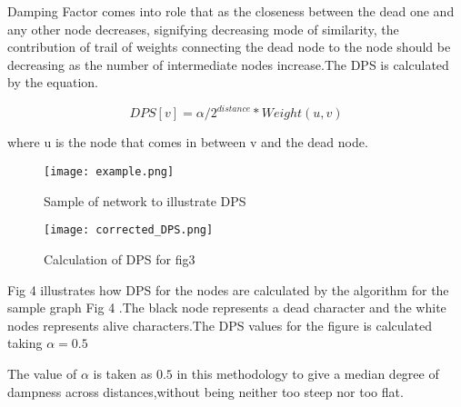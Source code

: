 \documentclass[conference]{IEEEtran}
\begin{document}
Damping Factor comes into role that as the closeness between the dead one and any other node decreases, signifying decreasing mode of similarity, the contribution of trail of weights connecting the dead node to the node should be decreasing as the number of intermediate nodes increase.The DPS is calculated by the equation.


$$DPS[v]= \alpha/2^{distance}*Weight(u,v)$$

where u is the node that comes in between v and the dead node.

\begin{figure}
    \centering
    \texttt{[image: example.png]}
    \caption{Sample of network to illustrate DPS}
    \label{fig:3}
\end{figure}

\begin{figure}
    \centering
    \texttt{[image: corrected\_DPS.png]}
    \caption{Calculation of DPS for fig3}
    \label{fig:4}
\end{figure}









Fig 4 illustrates how DPS for the nodes are calculated by the algorithm for the sample graph Fig 4 .The black node represents a dead character and the white nodes represents alive characters.The DPS values for the figure is calculated taking $\alpha=0.5$


The value of $\alpha$ is taken as $0.5$ in this methodology to give a median degree of dampness across distances,without being neither too steep nor too flat.  

\end{document}
